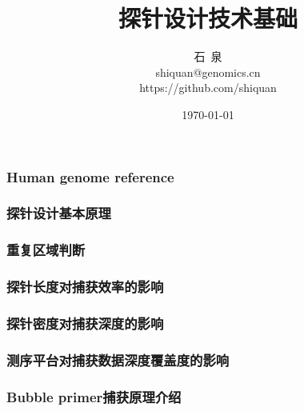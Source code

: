 \documentclass[12pt]{beamer}
\title{\huge{探针设计技术基础}}
\author{\large{石\ 泉}\\shiquan@genomics.cn\\https://github.com/shiquan}
\date{\today}
\begin{document}
\begin{frame}\frametitle{Human genome reference}

\end{frame}

\begin{frame}\frametitle{探针设计基本原理}
  \end{frame}

\begin{frame}\frametitle{重复区域判断}
  \end{frame}

\begin{frame}\frametitle{探针长度对捕获效率的影响}
  \end{frame}

\begin{frame}\frametitle{探针密度对捕获深度的影响}
  \end{frame}

\begin{frame}\frametitle{测序平台对捕获数据深度覆盖度的影响}
\end{frame}

\begin{frame}\frametitle{Bubble primer捕获原理介绍}
  \end{frame}
\end{document}
